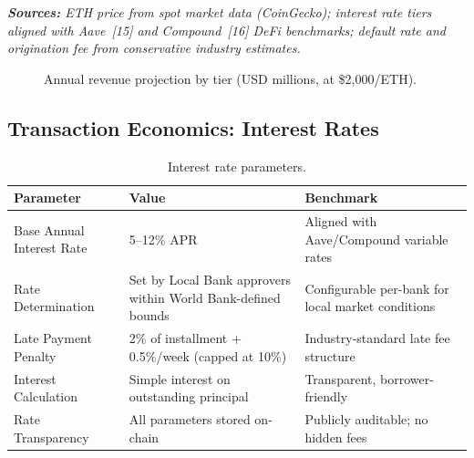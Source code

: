 \documentclass[12pt,a4paper]{report}
\newcommand{\tableheadfont}{\bfseries\small\color{PrimaryBlue}}
\newenvironment{moderntable}[1][H]{%
    \begin{table}[#1]\centering\small%
    \renewcommand{\arraystretch}{1.35}%
}{%
    \end{table}%
}
\begin{document}
\vspace{4pt}
\noindent\textit{\small\textbf{Sources:} ETH price from spot market data (CoinGecko); interest rate tiers aligned with Aave~[15] and Compound~[16] DeFi benchmarks; default rate and origination fee from conservative industry estimates.}

\begin{figure}[H]
\centering
{}
\caption{Annual revenue projection by tier (USD millions, at \$2{,}000/ETH).}
\end{figure}

\subsection{Transaction Economics: Interest Rates}
\label{sec:interest-rates}

\begin{moderntable}
\caption{Interest rate parameters.}
\begin{tabular}{@{} >{\raggedright}p{3.5cm} >{\raggedright}p{3.5cm} >{\raggedright\arraybackslash}p{5cm} @{}}
\toprule
\tableheadfont Parameter & \tableheadfont Value & \tableheadfont Benchmark \\
\midrule
\rowcolor{RowShade}
Base Annual Interest Rate & 5--12\% APR & Aligned with Aave/Compound variable rates \\
Rate Determination & Set by Local Bank approvers within World Bank-defined bounds & Configurable per-bank for local market conditions \\
\rowcolor{RowShade}
Late Payment Penalty & 2\% of installment + 0.5\%/week (capped at 10\%) & Industry-standard late fee structure \\
Interest Calculation & Simple interest on outstanding principal & Transparent, borrower-friendly \\
\rowcolor{RowShade}
Rate Transparency & All parameters stored on-chain & Publicly auditable; no hidden fees \\
\bottomrule
\end{tabular}
\end{moderntable}
\end{document}
